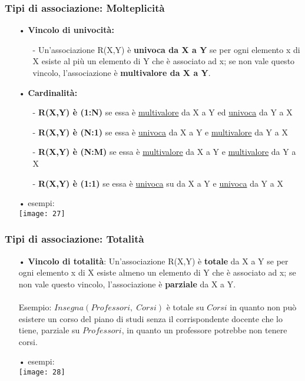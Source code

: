 \documentclass[12pt, letterpaper]{article}
\begin{document}
\subsubsection{Tipi di associazione: Molteplicità}
\begin{itemize}
   \item[•] \textbf{Vincolo di univocità:}
      \begin{itemize}
         \item[-] Un'associazione R(X,Y) è \textbf{univoca da X a Y} se per ogni elemento x di X
         esiste al più un elemento di Y che è associato ad x; se non vale questo
            vincolo, l’associazione è \textbf{multivalore da X a Y}.
      \end{itemize}
   \item[•] \textbf{Cardinalità:}
      \begin{itemize}
         \item[-] \textbf{R(X,Y) è (1:N)} se essa è \underline{multivalore} da X a Y ed \underline{univoca} da Y a X
         \item[-] \textbf{R(X,Y) è (N:1)} se essa è \underline{univoca} da X a Y e \underline{multivalore} da Y a X
         \item[-] \textbf{R(X,Y) è (N:M)} se essa è \underline{multivalore} da X a Y e \underline{multivalore} da Y a X
         \item[-] \textbf{R(X,Y) è (1:1)} se essa è \underline{univoca} su da X a Y e \underline{univoca} da Y a X
      \end{itemize}
   \item[•] esempi:\\
      \texttt{[image: 27]}
\end{itemize}

\subsubsection{Tipi di associazione: Totalità}

\begin{itemize}
   \item[•] \textbf{Vincolo di totalità}: Un'associazione R(X,Y) è \textbf{totale} da X a Y se per ogni elemento x di X 
      esiste almeno un elemento di Y che è associato ad x; se non vale questo vincolo, l'associazione è \textbf{parziale} da X a Y.
      \\
      \\
      Esempio: $Insegna(Professori,\;Corsi)$ è totale su $Corsi$ in quanto non può esistere un corso 
      del piano di studi senza il corrispondente docente che lo tiene, parziale su $Professori$, in quanto un professore potrebbe non tenere corsi.
   \item[•] esempi:\\
      \texttt{[image: 28]}
\end{itemize}
\end{document}
